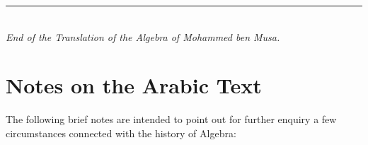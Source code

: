 \clearpage

\vspace{1cm}
\begin{center}
\rule{0.5\textwidth}{1pt}\\[0.5cm]
{\small\textit{End of the Translation of the Algebra of Mohammed ben Musa.}}
\end{center}

\vfill
\clearpage

\section*{Notes on the Arabic Text}

The following brief notes are intended to point out for further enquiry a few circumstances connected with the history of Algebra:

